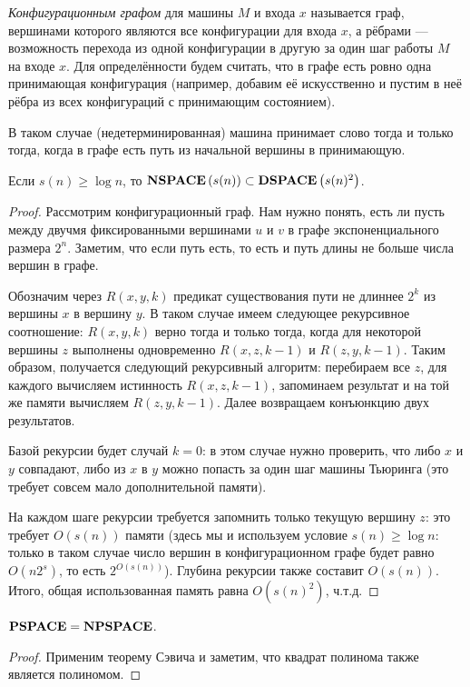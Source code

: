 \begin{definition} \textit{Конфигурационным графом} для машины $M$ и входа $x$ называется граф, вершинами которого являются все конфигурации для входа $x$, а рёбрами --- возможность перехода из одной конфигурации в другую за один шаг работы $M$ на входе $x$. Для определённости будем считать, что в графе есть ровно одна принимающая конфигурация (например, добавим её искусственно и пустим в неё рёбра из всех конфигураций с принимающим состоянием).
\end{definition}

\begin{note} В таком случае (недетерминированная) машина принимает слово тогда и только тогда, когда в графе есть путь из начальной вершины в принимающую.
\end{note}

\begin{theorem}[Сэвич] Если $s(n) \ge \log n$, то $\textbf{NSPACE}\left({s(n)}\right) \subset \textbf{DSPACE}\left({s(n)^2}\right)$.
\end{theorem}

\begin{proof} Рассмотрим конфигурационный граф. Нам нужно понять, есть ли пусть между двучмя фиксированными вершинами $u$ и $v$ в графе экспоненциального размера $2^n$. Заметим, что если путь есть, то есть и путь длины не больше числа вершин в графе. 

Обозначим через $R(x, y, k)$ предикат существования пути не длиннее $2^k$ из вершины $x$ в вершину $y$. В таком случае имеем следующее рекурсивное соотношение: $R(x, y, k)$ верно тогда и только тогда, когда для некоторой вершины $z$ выполнены одновременно $R(x, z, k-1)$ и $R(z, y, k-1)$. Таким образом, получается следующий рекурсивный алгоритм: перебираем все $z$, для каждого вычисляем истинность $R(x, z, k-1)$, запоминаем результат и на той же памяти вычисляем $R(z, y, k-1)$. Далее возвращаем конъюнкцию двух результатов.

Базой рекурсии будет случай $k=0$: в этом случае нужно проверить, что либо $x$ и $y$ совпадают, либо из $x$ в $y$ можно попасть за один шаг машины Тьюринга (это требует совсем мало дополнительной памяти).

На каждом шаге рекурсии требуется запомнить только текущую вершину $z$: это требует $O(s(n))$ памяти (здесь мы и используем условие $s(n) \geq \log n$: только в таком случае число вершин в конфигурационном графе будет равно $O(n2^s)$, то есть $2^{O(s(n))}$). Глубина рекурсии также составит $O(s(n))$. Итого, общая использованная память равна $O(s(n)^2)$, ч.т.д.
\end{proof}

\begin{corollary}
$\textbf{PSPACE} = \textbf{NPSPACE}$.
\end{corollary}

\begin{proof} Применим теорему Сэвича и заметим, что квадрат полинома также является полиномом.
\end{proof}